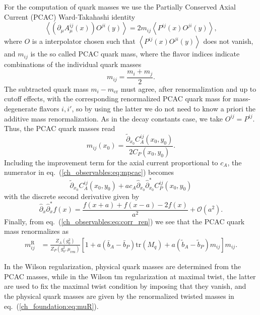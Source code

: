 For the computation of quark masses we use the Partially Conserved Axial Current (PCAC) Ward-Takahashi identity
\begin{equation}
\label{ch_observables:eq:PCAC}
\left<\left(\partial_{\mu}A^{ij}_{\mu}(x)\right)O^{ji}(y)\right>=2m_{ij}\left<P^{ij}(x)O^{ji}(y)\right>,
\end{equation}
where $O$ is a interpolator chosen such that $\left<P^{ij}(x)O^{ji}(y)\right>$ does not vanish, and $m_{ij}$ is the so called PCAC quark mass, where the flavor indices indicate combinations of the individual quark masses
\begin{equation}
m_{ij}=\frac{m_i+m_{j}}{2}.
\end{equation}
The subtracted quark mass $m_{i}-m_{\textrm{cr}}$ must agree, after renormalization and up to cutoff effects, with the corresponding renormalized PCAC quark mass for mass-degenerate flavors $i,i'$, so by using the latter we do not need to know a priori the additive mass renormalization. As in the decay constants case, we take $O^{ij}=P^{ij}$. Thus, the PCAC quark masses read
\begin{equation}
\label{ch_observables:eq:mpcac}
m_{ij}(x_0)=\frac{\tilde{\partial}_{x_0}C_A^{ij}(x_0,y_0)}{2C_P(x_0,y_0)}.
\end{equation}
Including the improvement term for the axial current proportional to $c_A$, the numerator in eq.~(\ref{ch_observables:eq:mpcac}) becomes
\begin{equation}
\tilde{\partial}_{x_0}C_A^{ij}(x_0,y_0)+ac_A\hat{\partial}_{x_0}\hat{\partial}^*_{x_0}C_P^{ij}(x_0,y_0)
\end{equation}
with the discrete second derivative given by
\begin{equation}
\hat{\partial}_{x}\hat{\partial}^*_xf(x)=\frac{f(x+a)+f(x-a)-2f(x)}{a^2}+\mathcal{O}(a^2).
\end{equation}
Finally, from eq.~(\ref{ch_observables:eq:corr_ren}) we see that the PCAC quark mass renormalizes as
\begin{align}
\label{ch_observables:eq:mqR}
m_{ij}^{\textrm{R}}&=\frac{Z_A(g_0^2)}{Z_P(g_0^2,\mu_{\textrm{ren}})}\left[1+a\left(\bar{b}_A-\bar{b}_P\right){\textrm{tr}}\left(M_q\right)+a\left(\tilde{b}_A-\tilde{b}_P\right)m_{ij}\right]m_{ij}.
\end{align}

In the Wilson regularization, physical quark masses are determined from the PCAC masses, while in the Wilson tm regularization at maximal twist, the latter are used to fix the maximal twist condition by imposing that they vanish, and the physical quark masses are given by the renormalized twisted masses in eq.~(\ref{ch_foundation:eq:muR}).


